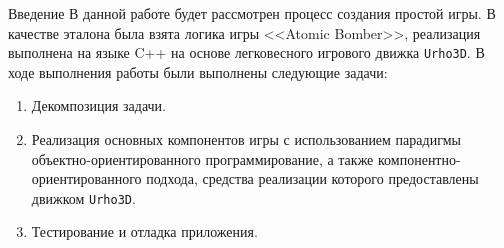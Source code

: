 \documentclass[a4paper, 14pt]{extarticle}
\numberwithin{equation}{section} %
\begin{document}


\tableofcontents

\begin{anonsection}{Введение}
В данной работе будет рассмотрен процесс создания простой игры.
В качестве эталона была взята логика игры <<Atomic Bomber>>, реализация выполнена на языке C++ на основе легковесного игрового движка \verb|Urho3D|.
В ходе выполнения работы были выполнены следующие задачи:
\begin{enumerate}
\item Декомпозиция задачи.
\item Реализация основных компонентов игры с использованием парадигмы объектно-ориентированного программирование, а также компонентно-ориентированного подхода, средства реализации которого предоставлены движком \verb|Urho3D|.
\item Тестирование и отладка приложения.
\end{enumerate}

\end{anonsection}
\end{document}
